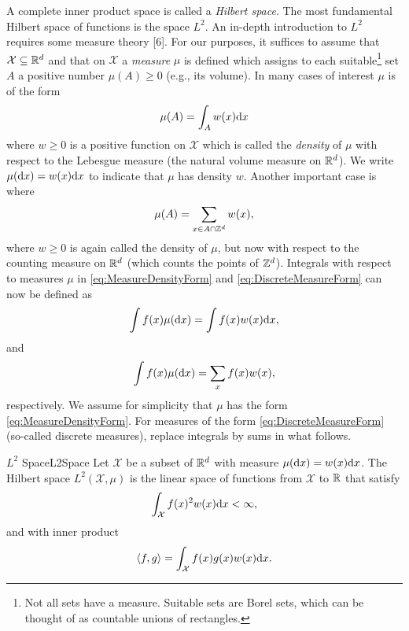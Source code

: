 A complete inner product space is called a \textit{Hilbert space}. The most fundamental Hilbert space of functions is the space \(L^2\). An in-depth introduction to \(L^2\) requires some measure theory [6]. For our purposes, it suffices to assume that \(\mathcal{X} \subseteq \mathbb{R}^d\) and that on \(\mathcal{X}\) a \textit{measure} \(\mu\) is defined which assigns to each suitable\footnote{Not all sets have a measure. Suitable sets are Borel sets, which can be thought of as countable unions of rectangles.} set \(A\) a positive number \(\mu(A) \ge 0\) (e.g., its volume). In many cases of interest \(\mu\) is of the form
\begin{equation}
	\mu(A) = \int_A w(x) \mathrm{d} x \label{eq:MeasureDensityForm}
\end{equation}
where \(w \ge 0\) is a positive function on \(\mathcal{X}\) which is called the \textit{density} of \(\mu\) with respect to the Lebesgue measure (the natural volume measure on \(\mathbb{R}^d\)). We write \(\mu(\mathrm{d} x) = w(x) \mathrm{d} x\) to indicate that \(\mu\) has density \(w\). Another important case is where
\begin{equation}
	\mu(A) = \sum_{x \in A \cap \mathbb{Z}^d} w(x), \label{eq:DiscreteMeasureForm}
\end{equation}
where \(w \ge 0\) is again called the density of \(\mu\), but now with respect to the counting measure on \(\mathbb{R}^d\) (which counts the points of \(\mathbb{Z}^d\)). Integrals with respect to measures \(\mu\) in \eqref{eq:MeasureDensityForm} and \eqref{eq:DiscreteMeasureForm} can now be defined as
\begin{equation*}
	\int f(x) \mu(\mathrm{d} x) = \int f(x) w(x) \mathrm{d} x,
\end{equation*}
and
\begin{equation*}
	\int f(x) \mu(\mathrm{d} x) = \sum_x f(x) w(x),
\end{equation*}
respectively. We assume for simplicity that \(\mu\) has the form \eqref{eq:MeasureDensityForm}. For measures of the form \eqref{eq:DiscreteMeasureForm} (so-called discrete measures), replace integrals by sums in what follows.

\begin{defn}{\(L^2\) Space}{L2Space}
	Let \(\mathcal{X}\) be a subset of \(\mathbb{R}^d\) with measure \(\mu(\mathrm{d} x) = w(x) \mathrm{d} x\). The Hilbert space \(L^2(\mathcal{X}, \mu)\) is the linear space of functions from \(\mathcal{X}\) to \(\mathbb{R}\) that satisfy
	\begin{equation}
		\int_{\mathcal{X}} f(x)^2 w(x) \mathrm{d} x < \infty, \label{eq:L2Integrability}
	\end{equation}
	and with inner product
	\begin{equation}
		\langle f, g \rangle = \int_{\mathcal{X}} f(x) g(x) w(x) \mathrm{d} x. \label{eq:L2InnerProduct}
	\end{equation}
\end{defn}

